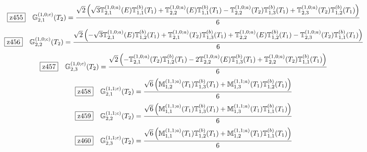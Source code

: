 \documentclass[fleqn,10pt,landscape]{jsarticle}
\begin{document}
\begin{dmath*}
\hspace*{3mm}\fbox{z455}\quad \mathbb{G}_{2,1}^{(1,0;c)}(T_{2})=\frac{\sqrt{2} \left(\sqrt{3} \mathbb{T}_{2,1}^{(1,0;a)}(E) \mathbb{T}_{1,1}^{(b)}(T_{1}) + \mathbb{T}_{2,2}^{(1,0;a)}(E) \mathbb{T}_{1,1}^{(b)}(T_{1}) - \mathbb{T}_{2,2}^{(1,0;a)}(T_{2}) \mathbb{T}_{1,3}^{(b)}(T_{1}) + \mathbb{T}_{2,3}^{(1,0;a)}(T_{2}) \mathbb{T}_{1,2}^{(b)}(T_{1})\right)}{6}
\end{dmath*}
\begin{dmath*}
\hspace*{3mm}\fbox{z456}\quad \mathbb{G}_{2,2}^{(1,0;c)}(T_{2})=\frac{\sqrt{2} \left(- \sqrt{3} \mathbb{T}_{2,1}^{(1,0;a)}(E) \mathbb{T}_{1,2}^{(b)}(T_{1}) + \mathbb{T}_{2,1}^{(1,0;a)}(T_{2}) \mathbb{T}_{1,3}^{(b)}(T_{1}) + \mathbb{T}_{2,2}^{(1,0;a)}(E) \mathbb{T}_{1,2}^{(b)}(T_{1}) - \mathbb{T}_{2,3}^{(1,0;a)}(T_{2}) \mathbb{T}_{1,1}^{(b)}(T_{1})\right)}{6}
\end{dmath*}
\begin{dmath*}
\hspace*{3mm}\fbox{z457}\quad \mathbb{G}_{2,3}^{(1,0;c)}(T_{2})=\frac{\sqrt{2} \left(- \mathbb{T}_{2,1}^{(1,0;a)}(T_{2}) \mathbb{T}_{1,2}^{(b)}(T_{1}) - 2 \mathbb{T}_{2,2}^{(1,0;a)}(E) \mathbb{T}_{1,3}^{(b)}(T_{1}) + \mathbb{T}_{2,2}^{(1,0;a)}(T_{2}) \mathbb{T}_{1,1}^{(b)}(T_{1})\right)}{6}
\end{dmath*}
\begin{dmath*}
\hspace*{3mm}\fbox{z458}\quad \mathbb{G}_{2,1}^{(1,1;c)}(T_{2})=\frac{\sqrt{6} \left(\mathbb{M}_{1,2}^{(1,1;a)}(T_{1}) \mathbb{T}_{1,3}^{(b)}(T_{1}) + \mathbb{M}_{1,3}^{(1,1;a)}(T_{1}) \mathbb{T}_{1,2}^{(b)}(T_{1})\right)}{6}
\end{dmath*}
\begin{dmath*}
\hspace*{3mm}\fbox{z459}\quad \mathbb{G}_{2,2}^{(1,1;c)}(T_{2})=\frac{\sqrt{6} \left(\mathbb{M}_{1,1}^{(1,1;a)}(T_{1}) \mathbb{T}_{1,3}^{(b)}(T_{1}) + \mathbb{M}_{1,3}^{(1,1;a)}(T_{1}) \mathbb{T}_{1,1}^{(b)}(T_{1})\right)}{6}
\end{dmath*}
\begin{dmath*}
\hspace*{3mm}\fbox{z460}\quad \mathbb{G}_{2,3}^{(1,1;c)}(T_{2})=\frac{\sqrt{6} \left(\mathbb{M}_{1,1}^{(1,1;a)}(T_{1}) \mathbb{T}_{1,2}^{(b)}(T_{1}) + \mathbb{M}_{1,2}^{(1,1;a)}(T_{1}) \mathbb{T}_{1,1}^{(b)}(T_{1})\right)}{6}
\end{dmath*}
\vspace{5mm}
\end{document}
